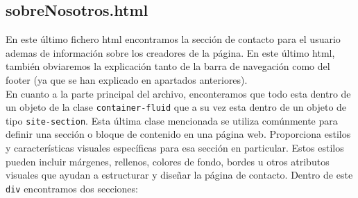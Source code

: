 \documentclass{article}
\begin{document}
\subsection{sobreNosotros.html}
En este último fichero html encontramos la sección de contacto para el usuario ademas de información sobre los creadores de la página. En este último html, también obviaremos la explicación tanto de la barra de navegación como del footer (ya que se han explicado en apartados anteriores).\\

\noindent En cuanto a la parte principal del archivo, enconteramos que todo esta dentro de un objeto de la clase \texttt{container-fluid} que a su vez esta dentro de un objeto de tipo \texttt{site-section}. Esta última clase mencionada se utiliza comúnmente para definir una sección o bloque de contenido en una página web. Proporciona estilos y características visuales específicas para esa sección en particular. Estos estilos pueden incluir márgenes, rellenos, colores de fondo, bordes u otros atributos visuales que ayudan a estructurar y diseñar la página de contacto. Dentro de este \texttt{div} encontramos dos secciones:
\end{document}
